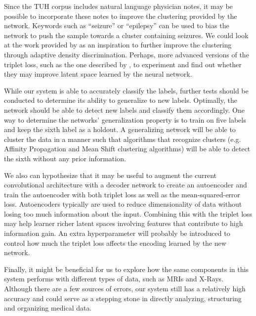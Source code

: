 Since the TUH corpus includes natural language physician notes, it may be possible to incorporate these notes to improve the clustering provided by the network. Keywords such as ``seizure'' or ``epilepsy'' can be used to bias the network to push the sample towards a cluster containing seizures. We could look at the work provided by \citet{magnetloss} as an inspiration to further improve the clustering through adaptive density discrimination. Perhaps, more advanced versions of the triplet loss, such as the one described by \citet{lifted_structure_embedding}, to experiment and find out whether they may improve latent space learned by the neural network. 

While our system is able to accurately classify the labels, further tests should be conducted to determine its ability to generalize to new labels. Optimally, the network should be able to detect new labels and classify them accordingly. One way to determine the networks' generalization property is to train on five labels and keep the sixth label as a holdout. A generalizing network will be able to cluster the data in a manner such that algorithms that recognize clusters (e.g. Affinity Propagation \cite{frey2007clustering} and Mean Shift \cite{comaniciu2002mean} clustering algorithms) will be able to detect the sixth without any prior information.

We also can hypothesize that it may be useful to augment the current convolutional architecture with a decoder network to create an autoencoder and train the autoencoder with both triplet loss as well as the mean-squared-error loss. Autoencoders typically are used to reduce dimensionality of data without losing too much information about the input. Combining this with the triplet loss may help learner richer latent spaces involving features that contribute to high information gain. An extra hyperparameter will probably be introduced to control how much the triplet loss affects the encoding learned by the new network. 

Finally, it might be beneficial for us to explore how the same components in this system performs with different types of data, such as MRIs and X-Rays.  Although there are a few sources of errors, our system still has a relatively high accuracy and could serve as a stepping stone in directly analyzing, structuring and organizing medical data. 







